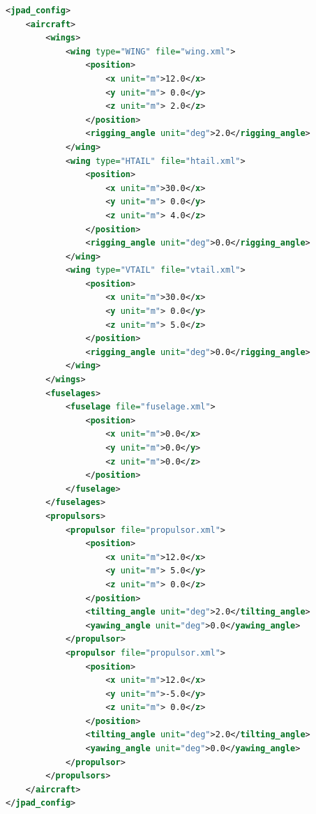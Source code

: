 \bigskip
\begin{lstlisting}[caption={Prototype of the aircraft XML file}, captionpos=b, tabsize=6, language=XML, label={lst:AircraftXML}]
<jpad_config>
    <aircraft>
        <wings>
            <wing type="WING" file="wing.xml">
                <position>
                    <x unit="m">12.0</x>
                    <y unit="m"> 0.0</y>
                    <z unit="m"> 2.0</z>
                </position>
                <rigging_angle unit="deg">2.0</rigging_angle>
            </wing>
            <wing type="HTAIL" file="htail.xml">
                <position>
                    <x unit="m">30.0</x>
                    <y unit="m"> 0.0</y>
                    <z unit="m"> 4.0</z>
                </position>
                <rigging_angle unit="deg">0.0</rigging_angle>
            </wing>
            <wing type="VTAIL" file="vtail.xml">
                <position>
                    <x unit="m">30.0</x>
                    <y unit="m"> 0.0</y>
                    <z unit="m"> 5.0</z>
                </position>
                <rigging_angle unit="deg">0.0</rigging_angle>
            </wing>
        </wings>
        <fuselages>
            <fuselage file="fuselage.xml">
                <position>
                    <x unit="m">0.0</x>
                    <y unit="m">0.0</y>
                    <z unit="m">0.0</z>
                </position>
            </fuselage>
        </fuselages>
        <propulsors>
            <propulsor file="propulsor.xml">
                <position>
                    <x unit="m">12.0</x>
                    <y unit="m"> 5.0</y>
                    <z unit="m"> 0.0</z>
                </position>
                <tilting_angle unit="deg">2.0</tilting_angle>
                <yawing_angle unit="deg">0.0</yawing_angle>
            </propulsor>
            <propulsor file="propulsor.xml">
                <position>
                    <x unit="m">12.0</x>
                    <y unit="m">-5.0</y>
                    <z unit="m"> 0.0</z>
                </position>
                <tilting_angle unit="deg">2.0</tilting_angle>
                <yawing_angle unit="deg">0.0</yawing_angle>
            </propulsor>
        </propulsors>
    </aircraft>
</jpad_config>
\end{lstlisting}

